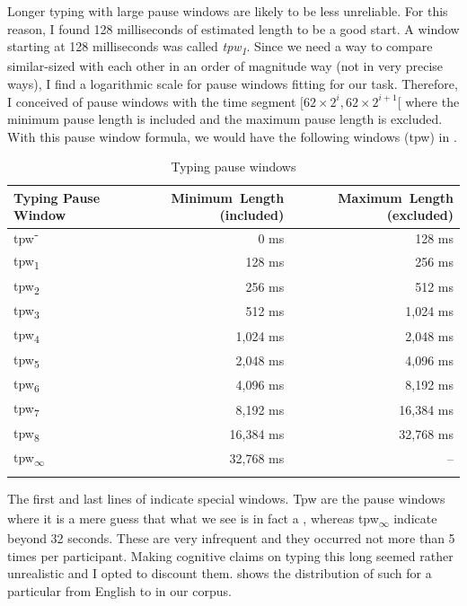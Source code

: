 \documentclass[output=paper]{LSP/langsci}
\begin{document}
Longer typing  with large pause windows are likely to be less unreliable. For this reason, I found 128 milliseconds of estimated  length to be a good start. A  window starting at 128 milliseconds was called \emph{tpw\textsubscript{1}}. Since we need a way to compare similar-sized  with each other in an order of magnitude way (not in very precise ways), I find a logarithmic scale for pause windows fitting for our task. Therefore, I conceived of pause windows with the time segment ${[}62\times 2^i, 62\times 2^{i+1}{[}$ where the minimum pause length is included and the maximum pause length is excluded. With this pause window formula, we would have the following  windows (tpw) in .

\begin{table}%
\centering
\begin{tabular}{lrr}
\lsptoprule
Typing Pause Window & \multicolumn{1}{p{3cm}}{\mbox{Minimum Length} \mbox{(included)}} & \multicolumn{1}{p{3cm}}{\mbox{Maximum Length} \mbox{(excluded)}}\\
\midrule
tpw⁻ & 0 ms & 128 ms \\
tpw\textsubscript{1} & 128 ms & 256 ms \\
tpw\textsubscript{2} & 256 ms & 512 ms \\
tpw\textsubscript{3} & 512 ms & 1,024 ms \\
tpw\textsubscript{4} & 1,024 ms & 2,048 ms \\
tpw\textsubscript{5} & 2,048 ms & 4,096 ms \\
tpw\textsubscript{6} & 4,096 ms & 8,192 ms \\
tpw\textsubscript{7} & 8,192 ms & 16,384 ms \\
tpw\textsubscript{8} & 16,384 ms & 32,768 ms \\
tpw\textsubscript{$\infty$} & 32,768 ms & -- \\
\lspbottomrule
\end{tabular}
\caption{Typing pause windows}
\label{couto:tab:7}
\end{table}

The first and last lines of  indicate special  windows. Tpw\textsubscript{\={ }} are the pause windows where it is a mere guess that what we see is in fact a , whereas tpw\textsubscript{$\infty$} indicate  beyond 32 seconds. These  are very infrequent and they occurred not more than 5 times per participant. Making cognitive claims on typing  this long seemed rather unrealistic and I opted to discount them.  shows the distribution of such  for a particular  from English to  in our corpus.
\end{document}
